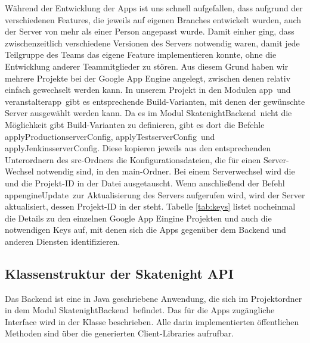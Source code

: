 Während der Entwicklung der Apps ist uns schnell aufgefallen, dass aufgrund der verschiedenen Features, die jeweils auf eigenen Branches entwickelt wurden, auch der Server von mehr als einer Person angepasst wurde. Damit einher ging, dass zwischenzeitlich verschiedene Versionen des Servers notwendig waren, damit jede Teilgruppe des Teams das eigene Feature implementieren konnte, ohne die Entwicklung anderer Teammitglieder zu stören. Aus diesem Grund haben wir mehrere Projekte bei der Google App Engine angelegt, zwischen denen relativ einfach gewechselt werden kann. In unserem Projekt in den Modulen \glqq app\grqq\ und \glqq veranstalterapp\grqq\ gibt es entsprechende Build-Varianten, mit denen der gewünschte Server ausgewählt werden kann. Da es im Modul \glqq SkatenightBackend\grqq\ nicht die Möglichkeit gibt Build-Varianten zu definieren, gibt es dort die Befehle \glqq applyProductionserverConfig\grqq, \glqq applyTestserverConfig\grqq\ und \glqq applyJenkinsserverConfig\grqq. Diese kopieren jeweils aus den entsprechenden Unterordnern des src-Ordners die Konfigurationsdateien, die für einen Server-Wechsel notwendig sind, in den main-Ordner. Bei einem Serverwechsel wird die  und die Projekt-ID in der Datei  ausgetauscht. Wenn anschließend der Befehl \glqq appengineUpdate\grqq\ zur Aktualisierung des Servers aufgerufen wird, wird der Server aktualisiert, dessen Projekt-ID in der  steht. Tabelle \ref{tab:keys} listet nocheinmal die Details zu den einzelnen Google App Eingine Projekten und auch die notwendigen Keys auf, mit denen sich die Apps gegenüber dem Backend und anderen Diensten identifizieren.

\subsection{Klassenstruktur der Skatenight API}
Das Backend ist eine in Java geschriebene Anwendung, die sich im Projektordner in dem Modul \glqq SkatenightBackend\grqq\ befindet. Das für die Apps zugängliche Interface wird in der Klasse  beschrieben. Alle darin implementierten öffentlichen Methoden sind über die generierten Client-Libraries aufrufbar.

